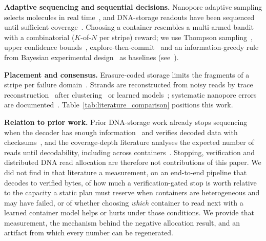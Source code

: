 \documentclass[acmsmall,screen]{acmart}
\begin{document}
\textbf{Adaptive sequencing and sequential decisions.}  Nanopore adaptive sampling selects
molecules in real time~\cite{loose2016real,payne2021readfish,weilguny2023dynamic}, and
DNA-storage readouts have been sequenced until sufficient coverage~\cite{lopez2019dna}.
Choosing a container resembles a multi-armed bandit with a combinatorial ($K$-of-$N$ per stripe)
reward; we use Thompson sampling~\cite{thompson1933likelihood,russo2018tutorial}, upper
confidence bounds~\cite{auer2002finite}, explore-then-commit~\cite{garivier2016explore} and an
information-greedy rule from Bayesian experimental design~\cite{chaloner1995bayesian} as
baselines (see~\cite{lattimore2020bandit}).

\textbf{Placement and consensus.}  Erasure-coded storage limits the fragments of a stripe per
failure domain~\cite{weil2006crush,cidon2013copysets,ford2010availability,nath2006subtleties,leong2012distributed}.
Strands are reconstructed from noisy reads by trace
reconstruction~\cite{batu2004reconstructing,srinivasavaradhan2021trellis,sabary2024reconstruction}
after clustering~\cite{rashtchian2017clustering} or learned models~\cite{barlev2025deep};
systematic nanopore errors are documented~\cite{delahaye2021sequencing,wick2019performance}.
Table~\ref{tab:literature_comparison} positions this work.

\textbf{Relation to prior work.}  Prior DNA-storage work already stops sequencing when the decoder has
enough information~\cite{lopez2019dna} and verifies decoded data with
checksums~\cite{erlich2017fountain}, and the coverage-depth literature analyses the expected number of
reads until decodability, including across
containers~\cite{barlev2025cover,kong2026coverage,levy2026expected}.  Stopping, verification and
distributed DNA read allocation are therefore not contributions of this paper.  We did not find in that
literature a measurement, on an end-to-end pipeline that decodes to verified bytes, of how much a
verification-gated stop is worth relative to the capacity a static plan must reserve when containers
are heterogeneous and may have failed, or of whether choosing \emph{which} container to read next with a
learned container model helps or hurts under those conditions.  We provide that measurement, the
mechanism behind the negative allocation result, and an artifact from which every number can be
regenerated.

\end{document}
